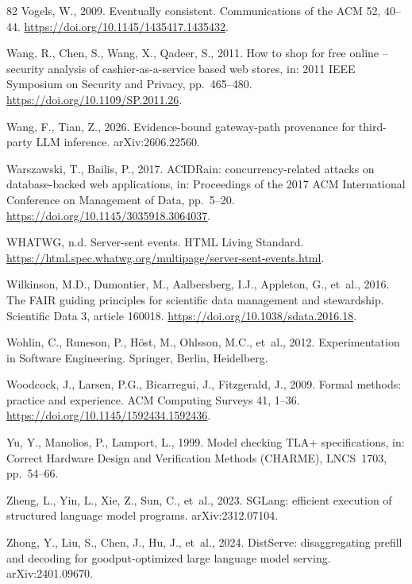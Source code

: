 \documentclass[preprint,3p,authoryear,12pt]{elsarticle}
\begin{document}
\begin{thebibliography}{82}
Vogels, W., 2009. Eventually consistent. Communications of the ACM 52, 40--44. \url{https://doi.org/10.1145/1435417.1435432}.

Wang, R., Chen, S., Wang, X., Qadeer, S., 2011. How to shop for free online -- security analysis of cashier-as-a-service based web stores, in: 2011 IEEE Symposium on Security and Privacy, pp.~465--480. \url{https://doi.org/10.1109/SP.2011.26}.

Wang, F., Tian, Z., 2026. Evidence-bound gateway-path provenance for third-party LLM
inference. arXiv:2606.22560.

Warszawski, T., Bailis, P., 2017. ACIDRain: concurrency-related attacks on database-backed web applications, in: Proceedings of the 2017 ACM International Conference on Management of Data, pp.~5--20. \url{https://doi.org/10.1145/3035918.3064037}.

WHATWG, n.d. Server-sent events. HTML Living Standard.
\url{https://html.spec.whatwg.org/multipage/server-sent-events.html}.

Wilkinson, M.D., Dumontier, M., Aalbersberg, I.J., Appleton, G., et~al., 2016. The FAIR guiding principles for scientific data management and stewardship. Scientific Data 3, article 160018. \url{https://doi.org/10.1038/sdata.2016.18}.

Wohlin, C., Runeson, P., H\"{o}st, M., Ohlsson, M.C., et~al., 2012. Experimentation in Software Engineering. Springer, Berlin, Heidelberg.

Woodcock, J., Larsen, P.G., Bicarregui, J., Fitzgerald, J., 2009. Formal methods: practice and experience. ACM Computing Surveys 41, 1--36. \url{https://doi.org/10.1145/1592434.1592436}.

Yu, Y., Manolios, P., Lamport, L., 1999. Model checking TLA+ specifications, in:
Correct Hardware Design and Verification Methods (CHARME), LNCS~1703, pp.~54--66.

Zheng, L., Yin, L., Xie, Z., Sun, C., et~al., 2023. SGLang: efficient execution of structured language model programs. arXiv:2312.07104.

Zhong, Y., Liu, S., Chen, J., Hu, J., et~al., 2024. DistServe: disaggregating prefill and decoding for goodput-optimized large language model serving. arXiv:2401.09670.

\end{thebibliography}
\end{document}
